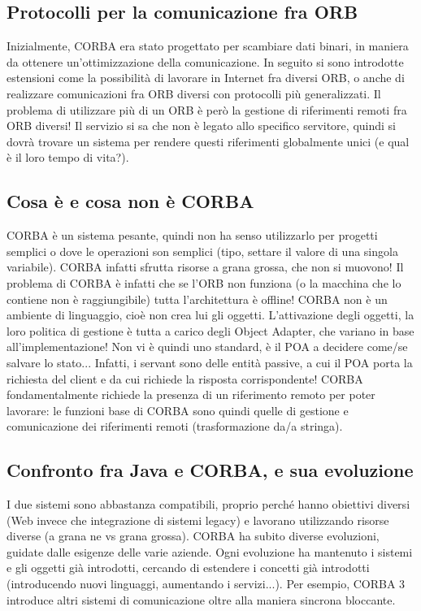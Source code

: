 \subsection{Protocolli per la comunicazione fra ORB}
Inizialmente, CORBA era stato progettato per scambiare dati binari, in maniera da ottenere un'ottimizzazione della 
comunicazione. In seguito si sono introdotte estensioni come la possibilità di lavorare in Internet fra diversi ORB, o 
anche di realizzare comunicazioni fra ORB diversi con protocolli più generalizzati.
Il problema di utilizzare più di un ORB è però la gestione di riferimenti remoti fra ORB diversi! Il servizio si sa 
che non è legato allo specifico servitore, quindi si dovrà trovare un sistema per rendere questi riferimenti 
globalmente unici (e qual è il loro tempo di vita?).
\subsection{Cosa è e cosa non è CORBA}
CORBA è un sistema pesante, quindi non ha senso utilizzarlo per progetti semplici o dove le operazioni son semplici 
(tipo, settare il valore di una singola variabile). CORBA infatti sfrutta risorse a grana grossa, che non si muovono!
Il problema di CORBA è infatti che se l'ORB non funziona (o la macchina che lo contiene non è raggiungibile) tutta 
l'architettura è offline!
CORBA non è un ambiente di linguaggio, cioè non crea lui gli oggetti. L'attivazione degli oggetti, la loro politica di 
gestione è tutta a carico degli Object Adapter, che variano in base all'implementazione! Non vi è quindi uno standard, è 
il POA a decidere come/se salvare lo stato... Infatti, i servant sono delle entità passive, a cui il POA porta la 
richiesta del client e da cui richiede la risposta corrispondente!
CORBA fondamentalmente richiede la presenza di un riferimento remoto per poter lavorare: le funzioni base di CORBA sono 
quindi quelle di gestione e comunicazione dei riferimenti remoti (trasformazione da/a stringa).
\subsection{Confronto fra Java e CORBA, e sua evoluzione}
I due sistemi sono abbastanza compatibili, proprio perché hanno obiettivi diversi (Web invece che integrazione di 
sistemi legacy) e lavorano utilizzando risorse diverse (a grana ne vs grana grossa).
CORBA ha subito diverse evoluzioni, guidate dalle esigenze delle varie aziende.
Ogni evoluzione ha mantenuto i sistemi e gli oggetti già introdotti, cercando di estendere i concetti già introdotti 
(introducendo nuovi linguaggi, aumentando i servizi...). Per esempio, CORBA 3 introduce altri sistemi di 
comunicazione oltre alla maniera sincrona bloccante.
